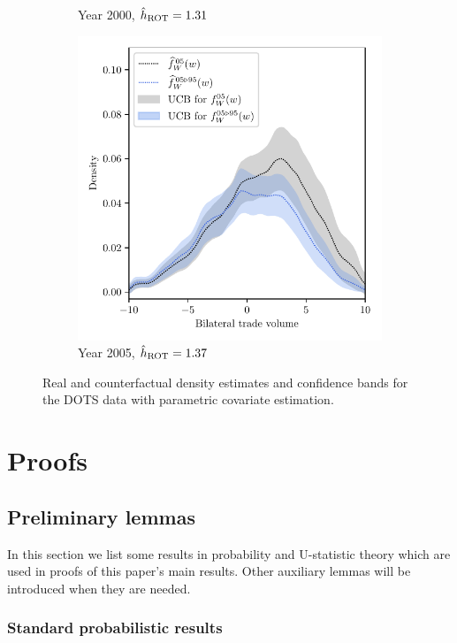 \begin{figure}[ht]
\begin{subfigure}{0.32\textwidth}
    \caption{Year 2000, $\hat h_{\operatorname{ROT}} = 1.31$}
  \end{subfigure}
  \begin{subfigure}{0.32\textwidth}
    \centering
    \includegraphics[scale=0.48]{graphics/trade_plot_parametric_1995_2005.pdf}
    \caption{Year 2005, $\hat h_{\operatorname{ROT}} = 1.37$}
  \end{subfigure}
  \caption{Real and counterfactual density estimates
    and confidence bands for the DOTS data
    with parametric covariate estimation.}
  \label{fig:trade_para}
\end{figure}

\section{Proofs}

\subsection{Preliminary lemmas}

In this section we list some results
in probability and U-statistic theory
which are used in proofs of this paper's main results.
Other auxiliary lemmas will be introduced when
they are needed.

\subsubsection{Standard probabilistic results}

